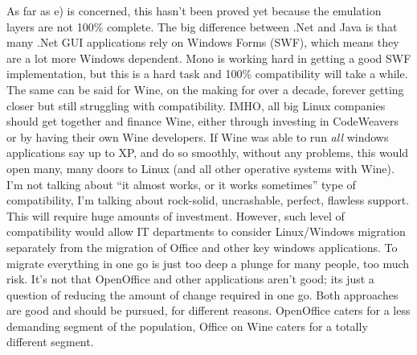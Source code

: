 \documentclass{book}
\begin{document}
As far as e) is concerned, this hasn't been proved yet because the
emulation layers are not 100\% complete. The big difference between
.Net and Java is that many .Net GUI applications rely on Windows Forms
(SWF), which means they are a lot more Windows dependent. Mono is
working hard in getting a good SWF implementation, but this is a hard
task and 100\% compatibility will take a while. The same can be said
for Wine, on the making for over a decade, forever getting closer but
still struggling with compatibility. IMHO, all big Linux companies
should get together and finance Wine, either through investing in
CodeWeavers or by having their own Wine developers. If Wine was able
to run \emph{all} windows applications say up to XP, and do so
smoothly, without any problems, this would open many, many doors to
Linux (and all other operative systems with Wine). I'm not talking
about ``it almost works, or it works sometimes'' type of compatibility,
I'm talking about rock-solid, uncrashable, perfect, flawless
support. This will require huge amounts of investment. However, such
level of compatibility would allow IT departments to consider
Linux/Windows migration separately from the migration of Office and
other key windows applications. To migrate everything in one go is
just too deep a plunge for many people, too much risk. It's not that
OpenOffice and other applications aren't good; its just a question of
reducing the amount of change required in one go. Both approaches are
good and should be pursued, for different reasons. OpenOffice caters
for a less demanding segment of the population, Office on Wine caters
for a totally different segment.
\end{document}
